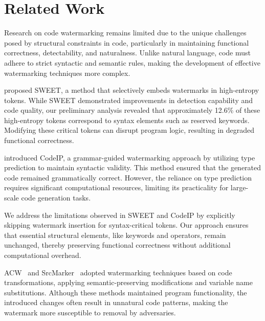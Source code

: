 \section{Related Work}
Research on code watermarking remains limited due to the unique 
challenges posed by structural constraints in code, particularly 
in maintaining functional correctness, detectability, and naturalness.
Unlike natural language, code must adhere to strict syntactic and 
semantic rules, making the development of effective watermarking 
techniques more complex.

\citet{lee-etal-2024-wrote} proposed SWEET,
a method that selectively embeds watermarks in high-entropy tokens.
While SWEET demonstrated improvements in detection capability 
and code quality, our preliminary analysis revealed that approximately 
12.6\% of these high-entropy tokens correspond to syntax elements 
such as reserved keywords. 
Modifying these critical tokens can disrupt program logic, 
resulting in degraded functional correctness.

\citet{guan2024codeip} introduced CodeIP, a grammar-guided 
watermarking approach by utilizing type prediction to maintain 
syntactic validity. 
This method ensured that the generated code remained grammatically correct. 
However, the reliance on type prediction requires significant 
computational resources, limiting its practicality for 
large-scale code generation tasks.

We address the limitations observed in SWEET and CodeIP by 
explicitly skipping watermark insertion for syntax-critical tokens. 
Our approach ensures that essential structural elements, 
like keywords and operators, remain unchanged, 
thereby preserving functional correctness without additional 
computational overhead.

ACW~\citep{li2024resilient} and SrcMarker~\citep{yang2024srcmarker} 
adopted watermarking techniques based on code transformations, 
applying semantic-preserving modifications and variable name substitutions. 
Although these methods maintained program functionality, the introduced 
changes often result in unnatural code patterns, 
making the watermark more susceptible 
to removal by adversaries.

